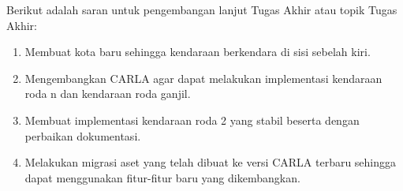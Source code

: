 Berikut adalah saran untuk pengembangan lanjut Tugas Akhir atau topik Tugas
Akhir:

\begin{enumerate}
	\item Membuat kota baru sehingga kendaraan berkendara di sisi sebelah kiri.
	\item Mengembangkan CARLA agar dapat melakukan implementasi kendaraan roda
	n dan kendaraan roda ganjil.
	\item Membuat implementasi kendaraan roda 2 yang stabil beserta dengan
	perbaikan dokumentasi.
	\item Melakukan migrasi aset yang telah dibuat ke versi CARLA terbaru
	sehingga dapat menggunakan fitur-fitur baru yang dikembangkan.
\end{enumerate}
